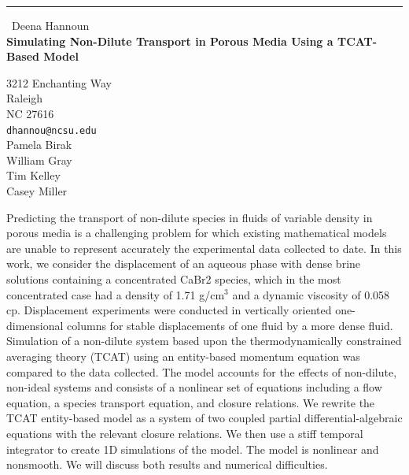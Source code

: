 \documentclass{report}
\begin{document}
\begin{center}
\rule{6in}{1pt} \
{\large Deena Hannoun \\
{\bf Simulating Non-Dilute Transport in Porous Media Using a TCAT-Based Model}}

3212 Enchanting Way \\ Raleigh \\ NC 27616
\\
{\tt dhannou@ncsu.edu}\\
Pamela Birak\\
William Gray\\
Tim Kelley\\
Casey Miller\end{center}

Predicting the transport of non-dilute species in fluids of variable
density in porous media is a challenging problem for which existing
mathematical models are unable to represent accurately the experimental
data collected to date. In this work, we consider the displacement of an
aqueous phase with dense brine solutions containing a concentrated CaBr2
species, which in the most concentrated case had a density of 1.71
g/cm$^3$ and a dynamic viscosity of 0.058 cp. Displacement experiments
were conducted in vertically oriented one-dimensional columns for stable
displacements of one fluid by a more dense fluid. Simulation of a
non-dilute system based upon the thermodynamically constrained averaging
theory (TCAT) using an entity-based momentum equation was compared to the
data collected. The model accounts for the effects of non-dilute,
non-ideal systems and consists of a nonlinear set of equations including
a flow equation, a species transport equation, and closure relations. We
rewrite the TCAT entity-based model as a system of two coupled partial
differential-algebraic equations with the relevant closure relations. We
then use a stiff temporal integrator to create 1D simulations of the
model. The model is nonlinear and nonsmooth. We will discuss both results
and numerical difficulties.
\end{document}
